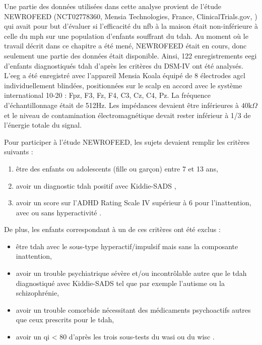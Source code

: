 Une partie des données utilisées dans cette analyse provient de l'étude NEWROFEED (NCT02778360, Mensia Technologies, France, ClinicalTrials.gov, \citet{Bioulac2019})
qui avait pour but d'évaluer si l'efficacité du \gls{nfb} à la maison était non-inférieure à celle du \gls{mph} sur une population d'enfants souffrant du \gls{tdah}.
Au moment où le travail décrit dans ce chapitre a été mené, NEWROFEED était en cours, donc 
seulement une partie des données était disponible. Ainsi, 122 enregistrements \gls{eegi} d'enfants diagnostiqués \gls{tdah} d'après les critères du DSM-IV \citep{DSM-4} 
ont été analysés. L'\gls{eeg} a été enregistré avec l'appareil Mensia Koala équipé de 8 électrodes \gls{agcl} individuellement blindées, positionnées sur le scalp en accord avec 
le système international 10-20 : Fpz, F3, Fz, F4, C3, Cz, C4, Pz. La fréquence d'échantillonnage était de 512Hz. Les impédances devaient être
inférieures à $40\text{k}\Omega$ et le niveau de contamination électromagnétique devait rester inférieur à 1/3 de l'énergie totale du signal. 

Pour participer à l'étude NEWROFEED, les sujets devaient remplir les critères suivants :
\begin{enumerate}
\item être des enfants ou adolescents (fille ou garçon) entre 7 et 13 ans,
\item avoir un diagnostic \gls{tdah} positif avec Kiddie-SADS \citep{Kaufman1997},
\item avoir un score sur l'ADHD Rating Scale IV supérieur à 6 pour l'inattention, avec ou sans hyperactivité \citep{Pappas2006}.
\end{enumerate}

De plus, les enfants correspondant à un de ces critères ont été exclus :
\begin{itemize}
\item être \gls{tdah} avec le sous-type hyperactif/impulsif mais sans la composante inattention,
\item avoir un trouble psychiatrique sévère et/ou incontrôlable autre que le \gls{tdah} diagnostiqué avec Kiddie-SADS tel que par 
exemple l'autisme ou la schizophrénie,
\item avoir un trouble comorbide nécessitant des médicaments psychoactifs autres que ceux prescrits pour le \gls{tdah},
\item avoir un \gls{qi} < 80 d'après les trois sous-tests du \gls{wasi} ou du \gls{wisc} \citep{Wechsler1999}.
\end{itemize}

